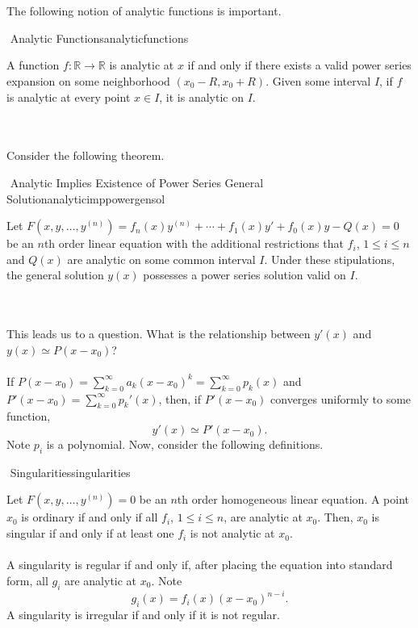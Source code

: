         \vphantom
        \\
        \\
        The following notion of analytic functions is important.
        \begin{definition}{\Stop\,\,Analytic Functions}{analyticfunctions}
            
            A function \(f:\mathbb{R}\to\mathbb{R}\) is analytic at \(x\) if and only if there exists a valid power series expansion on some neighborhood \((x_0-R,x_0+R)\). Given some interval \(I\), if \(f\) is analytic at every point \(x\in I\), it is analytic on \(I\).

        \end{definition}
        \pagebreak
        \vphantom
        \\
        \\
        Consider the following theorem.
        \begin{theorem}{\Stop\,\,Analytic Implies Existence of Power Series General Solution}{analyticimppowergensol}
            
            Let \(F(x,y,\ldots,y^{(n)})=f_n(x)y^{(n)}+\cdots+f_1(x)y'+f_0(x)y-Q(x)=0\) be an \(n\)th order linear equation with the additional restrictions that \(f_i\), \(1\leq i\leq n\) and \(Q(x)\) are analytic on some common interval \(I\). Under these stipulations, the general solution \(y(x)\) possesses a power series solution valid on \(I\).

        \end{theorem}
        \vphantom
        \\
        \\
        This leads us to a question. What is the relationship between \(y'(x)\) and \(y(x)\simeq P(x-x_0)\)?
        \\
        \\
        If \(P(x-x_0)=\sum_{k=0}^\infty a_k(x-x_0)^k=\sum_{k=0}^\infty p_k(x)\) and \(P'(x-x_0)=\sum_{k=0}^\infty p_k'(x)\), then, if \(P'(x-x_0)\) converges uniformly to some function,
        \begin{equation*}
            y'(x)\simeq P'(x-x_0).
        \end{equation*}
        Note \(p_i\) is a polynomial. Now, consider the following definitions.
        \begin{definition}{\Stop\,\,Singularities}{singularities}

            Let \(F(x,y,\ldots,y^{(n)})=0\) be an \(n\)th order homogeneous linear equation. A point \(x_0\) is ordinary if and only if all \(f_i\), \(1\leq i \leq n\), are analytic at \(x_0\). Then, \(x_0\) is singular if and only if at least one \(f_i\) is not analytic at \(x_0\).
            \\
            \\
            A singularity is regular if and only if, after placing the equation into standard form, all \(g_i\) are analytic at \(x_0\). Note
            \begin{equation*}
                g_i(x)=f_i(x)(x-x_0)^{n-i}.
            \end{equation*}
            A singularity is irregular if and only if it is not regular.
        \end{definition}

